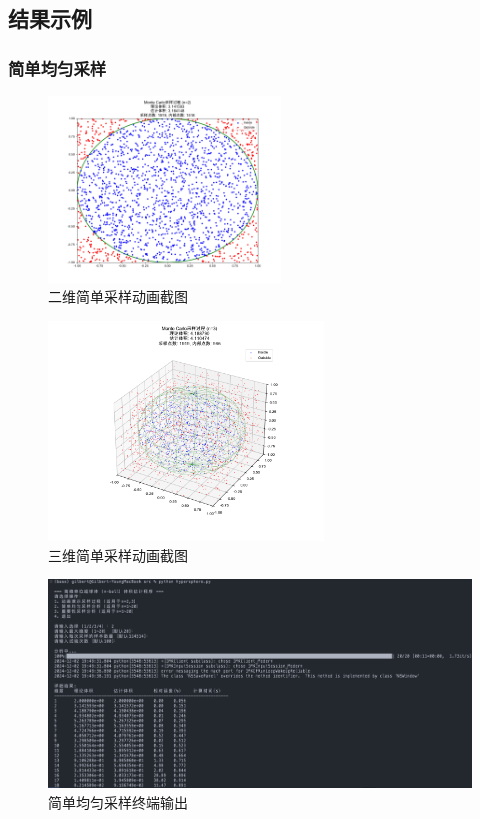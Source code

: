 \subsection{结果示例}
\subsubsection{简单均匀采样}
\begin{figure}[H]
    \centering
    \includegraphics[width=0.55\textwidth]{Problem_1/figs/2d_anim.png}
    \caption{二维简单采样动画截图}
\end{figure}

\begin{figure}[H]
    \centering
    \includegraphics[width=0.65\textwidth]{Problem_1/figs/3d_anim.png}
    \caption{三维简单采样动画截图}
\end{figure}

\begin{figure}[H]
    \centering
    \includegraphics[width=1.0\textwidth]{Problem_1/figs/simple_terminal.png}
    \caption{简单均匀采样终端输出}
\end{figure}

